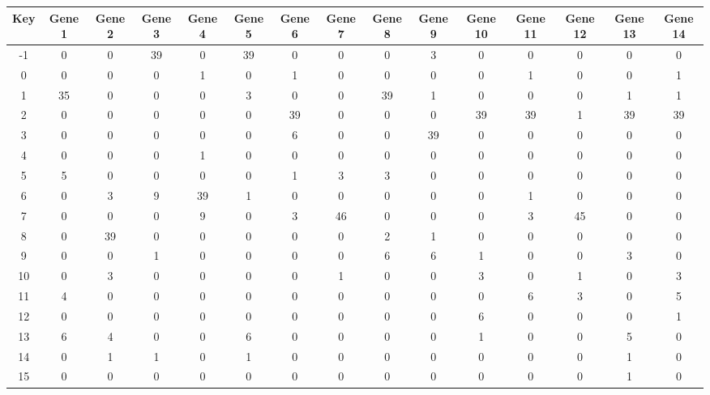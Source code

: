 \begin{tabular}{|c|c|c|c|c|c|c|c|c|c|c|c|c|c|c|}
\hline
Key & Gene 1 & Gene 2 & Gene 3 & Gene 4 & Gene 5 & Gene 6 & Gene 7 & Gene 8 & Gene 9 & Gene 10 & Gene 11 & Gene 12 & Gene 13 & Gene 14 \\
\hline
-1 & 0 & 0 & 39 & 0 & 39 & 0 & 0 & 0 & 3 & 0 & 0 & 0 & 0 & 0 \\
0 & 0 & 0 & 0 & 1 & 0 & 1 & 0 & 0 & 0 & 0 & 1 & 0 & 0 & 1 \\
1 & 35 & 0 & 0 & 0 & 3 & 0 & 0 & 39 & 1 & 0 & 0 & 0 & 1 & 1 \\
2 & 0 & 0 & 0 & 0 & 0 & 39 & 0 & 0 & 0 & 39 & 39 & 1 & 39 & 39 \\
3 & 0 & 0 & 0 & 0 & 0 & 6 & 0 & 0 & 39 & 0 & 0 & 0 & 0 & 0 \\
4 & 0 & 0 & 0 & 1 & 0 & 0 & 0 & 0 & 0 & 0 & 0 & 0 & 0 & 0 \\
5 & 5 & 0 & 0 & 0 & 0 & 1 & 3 & 3 & 0 & 0 & 0 & 0 & 0 & 0 \\
6 & 0 & 3 & 9 & 39 & 1 & 0 & 0 & 0 & 0 & 0 & 1 & 0 & 0 & 0 \\
7 & 0 & 0 & 0 & 9 & 0 & 3 & 46 & 0 & 0 & 0 & 3 & 45 & 0 & 0 \\
8 & 0 & 39 & 0 & 0 & 0 & 0 & 0 & 2 & 1 & 0 & 0 & 0 & 0 & 0 \\
9 & 0 & 0 & 1 & 0 & 0 & 0 & 0 & 6 & 6 & 1 & 0 & 0 & 3 & 0 \\
10 & 0 & 3 & 0 & 0 & 0 & 0 & 1 & 0 & 0 & 3 & 0 & 1 & 0 & 3 \\
11 & 4 & 0 & 0 & 0 & 0 & 0 & 0 & 0 & 0 & 0 & 6 & 3 & 0 & 5 \\
12 & 0 & 0 & 0 & 0 & 0 & 0 & 0 & 0 & 0 & 6 & 0 & 0 & 0 & 1 \\
13 & 6 & 4 & 0 & 0 & 6 & 0 & 0 & 0 & 0 & 1 & 0 & 0 & 5 & 0 \\
14 & 0 & 1 & 1 & 0 & 1 & 0 & 0 & 0 & 0 & 0 & 0 & 0 & 1 & 0 \\
15 & 0 & 0 & 0 & 0 & 0 & 0 & 0 & 0 & 0 & 0 & 0 & 0 & 1 & 0 \\
\hline
\end{tabular}